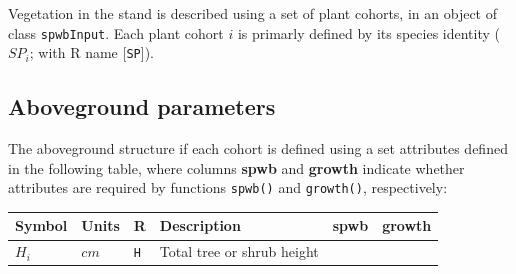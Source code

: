 \documentclass[]{book}
\begin{document}
Vegetation in the stand is described using a set of plant cohorts, in an
object of class \texttt{spwbInput}. Each plant cohort \(i\) is primarly
defined by its species identity (\(SP_i\); with R name
{[}\texttt{SP}{]}).

\subsection{Aboveground parameters}\label{aboveground-parameters}

The aboveground structure if each cohort is defined using a set
attributes defined in the following table, where columns \textbf{spwb}
and \textbf{growth} indicate whether attributes are required by
functions \texttt{spwb()} and \texttt{growth()}, respectively:

\begin{longtable}[]{@{}llllll@{}}
\toprule
\begin{minipage}[b]{0.10\columnwidth}\raggedright\strut
Symbol\strut
\end{minipage} & \begin{minipage}[b]{0.09\columnwidth}\raggedright\strut
Units\strut
\end{minipage} & \begin{minipage}[b]{0.06\columnwidth}\raggedright\strut
R\strut
\end{minipage} & \begin{minipage}[b]{0.43\columnwidth}\raggedright\strut
Description\strut
\end{minipage} & \begin{minipage}[b]{0.07\columnwidth}\raggedright\strut
spwb\strut
\end{minipage} & \begin{minipage}[b]{0.07\columnwidth}\raggedright\strut
growth\strut
\end{minipage}\tabularnewline
\midrule
\endhead
\begin{minipage}[t]{0.10\columnwidth}\raggedright\strut
\(H_i\)\strut
\end{minipage} & \begin{minipage}[t]{0.09\columnwidth}\raggedright\strut
\(cm\)\strut
\end{minipage} & \begin{minipage}[t]{0.06\columnwidth}\raggedright\strut
\texttt{H}\strut
\end{minipage} & \begin{minipage}[t]{0.43\columnwidth}\raggedright\strut
Total tree or shrub height\strut
\end{minipage} & \begin{minipage}[t]{0.07\columnwidth}\raggedright\strut

\end{minipage}
\end{longtable}
\end{document}
